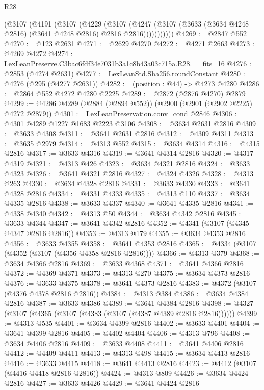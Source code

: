 \begin{lexlean}{R28}
\begin{coremodule}
          (@3107
            (@4191
              (@3107
                (@4229
                  (@3107
                    (@4247
                      (@3107 (@3633 (@3634 @4248 @2816) (@3641 @4248 @2816) @2816 @2816)))))))))))
@4269 := @2847 @552
@4270 := @123 @2631
@4271 := @2629 @4270
@4272 := @4271 @2663
@4273 := @4269 @4272
@4274 := LexLeanPreserve.C3bac6fdf34e7031b3a1c8b43a03c715a.R28.__fits_16
@4276 := @2853 (@4274 @2631)
@4277 := LexLeanStd.Sha256.roundConstant
@4280 := @4276 (@295 (@4277 @2631))
@4282 := (position : @44) -> @4273 @4280
@4286 := @2864 @552 @4272 @4280 @2225
@4289 := @2872 (@2876 @4270) @2879
@4299 := @4286 @4289 (@2884 (@2894 @552)) (@2900 (@2901 (@2902 @2225) @4272 @2879))
@4301 := LexLeanPreservation.conv_cond @2846
@4306 := @4301 @4289 @1227 @1683 @2223 @3106
@4308 := @3634 @2631 @2816
@4309 := @3633 @4308
@4311 := @3641 @2631 @2816
@4312 := @4309 @4311
@4313 := @3635 @2979
@4314 := @4313 @552
@4315 := @3634 @4314
@4316 := @4315 @2816
@4317 := @3633 @4316
@4319 := @3641 @4314 @2816
@4320 := @4317 @4319
@4321 := @4313 @426
@4323 := @3634 @4321 @2816
@4324 := @3633 @4323
@4326 := @3641 @4321 @2816
@4327 := @4324 @4326
@4328 := @4313 @263
@4330 := @3634 @4328 @2816
@4331 := @3633 @4330
@4333 := @3641 @4328 @2816
@4334 := @4331 @4333
@4335 := @4313 @110
@4337 := @3634 @4335 @2816
@4338 := @3633 @4337
@4340 := @3641 @4335 @2816
@4341 := @4338 @4340
@4342 := @4313 @50
@4344 := @3634 @4342 @2816
@4345 := @3633 @4344
@4347 := @3641 @4342 @2816
@4352 := @4341 (@3107 (@4345 @4347 @2816 @2816))
@4353 := @4313 @179
@4355 := @3634 @4353 @2816
@4356 := @3633 @4355
@4358 := @3641 @4353 @2816
@4365 := @4334 (@3107 (@4352 (@3107 (@4356 @4358 @2816 @2816))))
@4366 := @4313 @379
@4368 := @3634 @4366 @2816
@4369 := @3633 @4368
@4371 := @3641 @4366 @2816
@4372 := @4369 @4371
@4373 := @4313 @270
@4375 := @3634 @4373 @2816
@4376 := @3633 @4375
@4378 := @3641 @4373 @2816
@4383 := @4372 (@3107 (@4376 @4378 @2816 @2816))
@4384 := @4313 @384
@4386 := @3634 @4384 @2816
@4387 := @3633 @4386
@4389 := @3641 @4384 @2816
@4398 := @4327 (@3107 (@4365 (@3107 (@4383 (@3107 (@4387 @4389 @2816 @2816))))))
@4399 := @4313 @535
@4401 := @3634 @4399 @2816
@4402 := @3633 @4401
@4404 := @3641 @4399 @2816
@4405 := @4402 @4404
@4406 := @4313 @796
@4408 := @3634 @4406 @2816
@4409 := @3633 @4408
@4411 := @3641 @4406 @2816
@4412 := @4409 @4411
@4413 := @4313 @498
@4415 := @3634 @4413 @2816
@4416 := @3633 @4415
@4418 := @3641 @4413 @2816
@4423 := @4412 (@3107 (@4416 @4418 @2816 @2816))
@4424 := @4313 @809
@4426 := @3634 @4424 @2816
@4427 := @3633 @4426
@4429 := @3641 @4424 @2816

\end{coremodule}
\end{lexlean}
